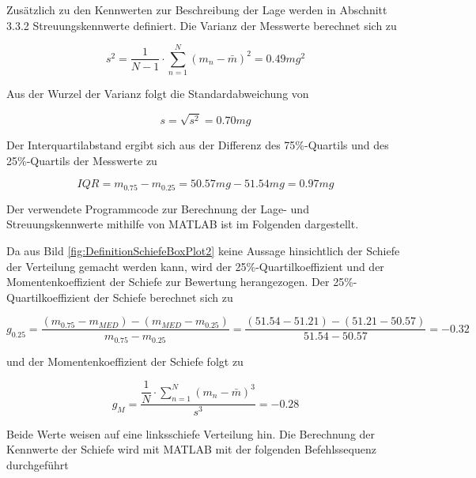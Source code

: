 \noindent Zus\"{a}tzlich zu den Kennwerten zur Beschreibung der Lage werden in Abschnitt 3.3.2 Streuungskennwerte definiert. Die Varianz der Messwerte berechnet sich zu

\begin{equation}\label{eq:threeseventy}
s^{2} =\dfrac{1}{N-1} \cdot \sum _{n=1}^{N}\left(m_{n} -\bar{m}\right)^{2}  =  0.49 mg^{2}
\end{equation}

\noindent Aus der Wurzel der Varianz folgt die Standardabweichung von

\begin{equation}\label{eq:threeseventyone}
s=\sqrt{s^{2}} = 0.70 mg
\end{equation}

\noindent Der Interquartilabstand ergibt sich aus der Differenz des 75\%-Quartils und des 25\%-Quartils der Messwerte zu

\begin{equation}\label{eq:threeseventytwo}
IQR=m_{0.75} -m_{0.25} =50.57 mg-51.54 mg= 0.97 mg
\end{equation}

\clearpage 

\noindent Der verwendete Programmcode zur Berechnung der Lage- und Streuungskennwerte mithilfe von MATLAB ist im Folgenden dargestellt.



\noindent Da aus Bild \ref{fig:DefinitionSchiefeBoxPlot2} keine Aussage hinsichtlich der Schiefe der Verteilung gemacht werden kann, wird der 25\%-Quartilkoeffizient und der Momentenkoeffizient der Schiefe zur Bewertung herangezogen. Der 25\%-Quartilkoeffizient der Schiefe berechnet sich zu

\begin{equation}\label{eq:threeseventythree}
g_{0.25} =\dfrac{\left(m_{0.75} -m_{MED} \right)-\left(m_{MED} -m_{0.25} \right)}{m_{0.75} -m_{0.25}} =\dfrac{\left(51.54-51.21\right)-\left(51.21-50.57\right)}{51.54-50.57} =-0.32
\end{equation}

\noindent und der Momentenkoeffizient der Schiefe folgt zu

\begin{equation}\label{eq:threeseventyfour}
g_{M} =\dfrac{\dfrac{1}{N} \cdot \displaystyle\sum\limits _{n=1}^{N}\left(m_{n} -\bar{m}\right)^{3}}{s^{3}} =-0.28
\end{equation}

\noindent Beide Werte weisen auf eine linksschiefe Verteilung hin. Die Berechnung der Kennwerte der Schiefe wird mit MATLAB mit der folgenden Befehlssequenz durchgef\"{u}hrt

